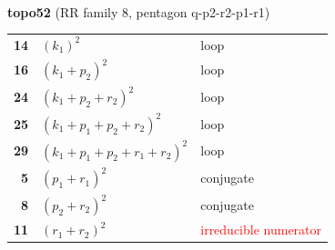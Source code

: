 \documentclass[10pt]{article}
\begin{document}
\begin{minipage}[t]{0.48\textwidth}
{}\\[2mm]\textbf{topo52} (RR family 8, pentagon q-p2-r2-p1-r1)\\[2pt]{\footnotesize\begin{tabular}{@{}r@{\ \ }l@{\ \ }l@{}}\textbf{14} & $(k_1)^2$ & loop\\
\textbf{16} & $(k_1+p_2)^2$ & loop\\
\textbf{24} & $(k_1+p_2+r_2)^2$ & loop\\
\textbf{25} & $(k_1+p_1+p_2+r_2)^2$ & loop\\
\textbf{29} & $(k_1+p_1+p_2+r_1+r_2)^2$ & loop\\
\textbf{5} & $(p_1+r_1)^2$ & conjugate\\
\textbf{8} & $(p_2+r_2)^2$ & conjugate\\
\textbf{11} & $(r_1+r_2)^2$ & \textcolor{red}{irreducible numerator}\\\end{tabular}}\end{minipage}

\bigskip
\end{document}
